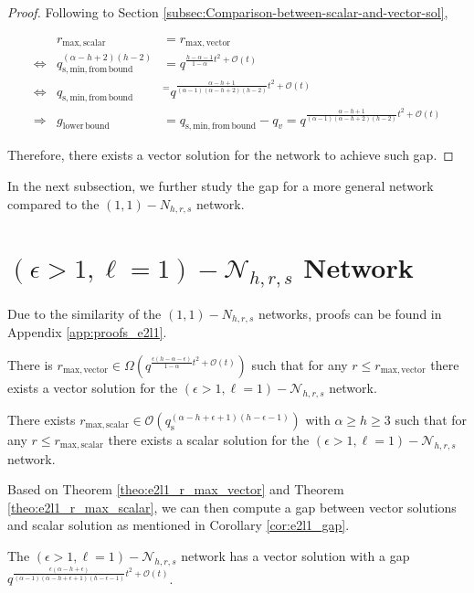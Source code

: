 \begin{proof}
Following to Section \ref{subsec:Comparison-between-scalar-and-vector-sol},

\begin{eqnarray*}
 & r_{\mathrm{max,scalar}} & =r_{\mathrm{max,vector}}\\
\Leftrightarrow & q_{\mathrm{s,min,from\,bound}}^{\left(\alpha-h+2\right)\left(h-2\right)} & =q^{\frac{h-\alpha-1}{1-\alpha}t^{2}+\mathcal{O}(t)}\\
\Leftrightarrow & q_{\mathrm{s,min,from\,bound}} & ^{=}q^{\frac{\alpha-h+1}{\left(\alpha-1\right)\left(\alpha-h+2\right)\left(h-2\right)}t^{2}+\mathcal{O}(t)}\\
\Rightarrow & g_{\mathrm{lower\,bound}} & =q_{\mathrm{s,min,from\,bound}}-q_{v}=q^{\frac{\alpha-h+1}{\left(\alpha-1\right)\left(\alpha-h+2\right)\left(h-2\right)}t^{2}+\mathcal{O}(t)}
\end{eqnarray*}

Therefore, there exists a vector solution for the network to achieve
such gap.
\end{proof}
In the next subsection, we further study the gap for a more general
network compared to the $\left(1,1\right)-\ensuremath{N}_{h,r,s}$
network.

\section{$\left(\epsilon>1,\ell=1\right)-\mathcal{N}_{h,r,s}$ Network}

Due to the similarity of the $\left(1,1\right)-\ensuremath{N}_{h,r,s}$
networks, proofs can be found in Appendix \ref{app:proofs_e2l1}.
\begin{thm}
There is $r_{\mathrm{max,vector}}\in\Omega\left(q^{\frac{\epsilon\left(h-\alpha-\epsilon\right)}{1-\alpha}t^{2}+\mathcal{O}(t)}\right)$
such that for any $r\leq r_{\mathrm{max,vector}}$ there exists a
vector solution for the $\left(\epsilon>1,\ell=1\right)-\mathcal{N}_{h,r,s}$
network. \label{theo:e2l1_r_max_vector}
\end{thm}
%
\begin{thm}
There exists $r_{\mathrm{max,scalar}}\in\mathcal{O}\left(q_{\mathrm{s}}^{\left(\alpha-h+\epsilon+1\right)\left(h-\epsilon-1\right)}\right)$
with $\alpha\geq h\geq3$ such that for any $r\leq r_{\mathrm{max,scalar}}$
there exists a scalar solution for the $\left(\epsilon>1,\ell=1\right)-\mathcal{N}_{h,r,s}$
network. \label{theo:e2l1_r_max_scalar}
\end{thm}
Based on Theorem \ref{theo:e2l1_r_max_vector} and Theorem \ref{theo:e2l1_r_max_scalar},
we can then compute a gap between vector solutions and scalar solution
as mentioned in Corollary \ref{cor:e2l1_gap}.
\begin{cor}
The $\left(\epsilon>1,\ell=1\right)-\mathcal{N}_{h,r,s}$ network
has a vector solution with a gap $q^{\frac{\epsilon\left(\alpha-h+\epsilon\right)}{\left(\alpha-1\right)\left(\alpha-h+\epsilon+1\right)\left(h-\epsilon-1\right)}t^{2}+\mathcal{O}(t)}$.
\label{cor:e2l1_gap}
\end{cor}

